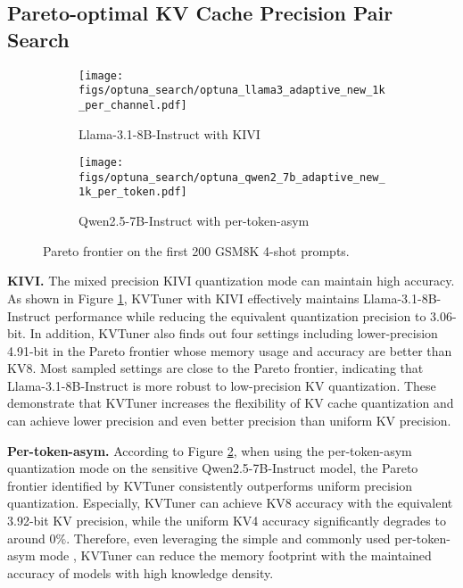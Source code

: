 \subsection{Pareto-optimal KV Cache Precision Pair Search}
\begin{figure}
    \centering
    \begin{subfigure}{0.45\columnwidth}
        \centering
        \texttt{[image: figs/optuna\_search/optuna\_llama3\_adaptive\_new\_1k\_per\_channel.pdf]}
        \vspace{-1em}
        \caption{Llama-3.1-8B-Instruct with KIVI}
        \label{fig:pareto_frontier_per_channel_asym_gsm8k_limit_200_Llama-3.1-8B-Instruct}
    \end{subfigure}
    \hfill
    \begin{subfigure}{0.45\columnwidth}
        \centering
        \texttt{[image: figs/optuna\_search/optuna\_qwen2\_7b\_adaptive\_new\_1k\_per\_token.pdf]}
        \vspace{-1em}
        \caption{Qwen2.5-7B-Instruct with per-token-asym}
        \label{fig:pareto_frontier_per_token_asym_gsm8k_limit_200_qwen2.5_7b_instruct}
    \end{subfigure}
    \caption{Pareto frontier on the first 200 GSM8K 4-shot prompts.}
    \label{fig:pareto_frontier_comparison}
\end{figure}
\textbf{KIVI.} The mixed precision KIVI quantization mode can maintain high accuracy. As shown in Figure \ref{fig:pareto_frontier_per_channel_asym_gsm8k_limit_200_Llama-3.1-8B-Instruct}, 
KVTuner with KIVI effectively maintains Llama-3.1-8B-Instruct performance while reducing the equivalent quantization precision to 3.06-bit.
In addition, KVTuner also finds out four settings including lower-precision 4.91-bit in the Pareto frontier whose memory usage and accuracy are better than KV8. Most sampled settings are close to the Pareto frontier, indicating that Llama-3.1-8B-Instruct is more robust to low-precision KV quantization. These demonstrate that KVTuner increases the flexibility of KV cache quantization and can achieve lower precision and even better precision than uniform KV precision. 

\textbf{Per-token-asym.} According to Figure \ref{fig:pareto_frontier_per_token_asym_gsm8k_limit_200_qwen2.5_7b_instruct}, when using the per-token-asym quantization mode on the sensitive Qwen2.5-7B-Instruct model, the Pareto frontier identified by KVTuner consistently outperforms uniform precision quantization. Especially, KVTuner can achieve KV8 accuracy with the equivalent 3.92-bit KV precision, while the uniform KV4 accuracy significantly degrades to around $0\%$. 
Therefore, even leveraging the simple and commonly used per-token-asym mode \cite{lin2024qserve,sheng2023flexgen}, KVTuner can reduce the memory footprint with the maintained accuracy of models with high knowledge density.

